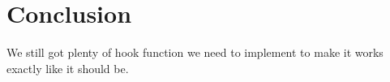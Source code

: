 
\section{Conclusion}
\label{sec:conclusion}

We still got plenty of hook function we need to implement to make it works exactly like it should be.

